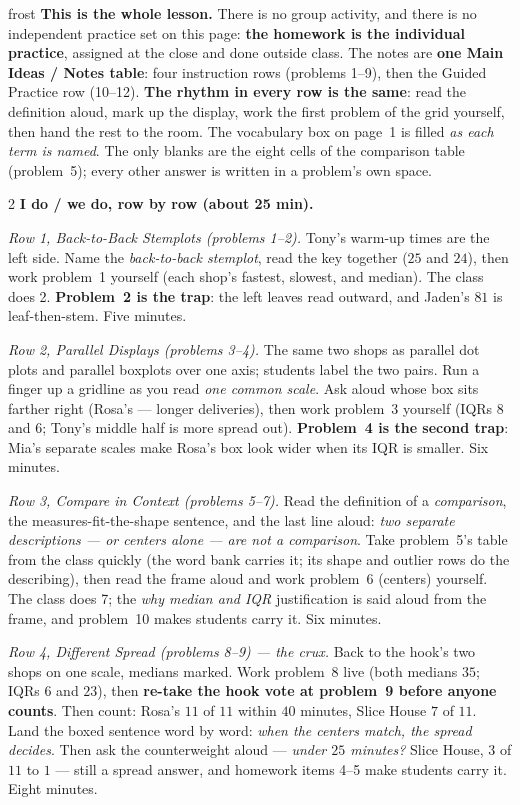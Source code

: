\documentclass[10pt]{article}
\begin{document}
\boxguard
\begin{skillbox}{frost}
\textbf{This is the whole lesson.} There is no group activity, and there is no independent
practice set on this page: \textbf{the homework is the individual practice}, assigned at the
close and done outside class. The notes are \textbf{one Main Ideas / Notes table}: four
instruction rows (problems 1--9), then the Guided Practice row (10--12). \textbf{The rhythm
in every row is the same}: read the definition aloud, mark up the display, work the first
problem of the grid yourself, then hand the rest to the room. The vocabulary box on page~1 is
filled \emph{as each term is named}. The only blanks are the eight cells of the comparison
table (problem~5); every other answer is written in a problem's own space.
\begin{multicols}{2}
\textbf{I do / we do, row by row (about 25 min).}

\emph{Row 1, Back-to-Back Stemplots (problems 1--2).} Tony's warm-up times are the left
side. Name the \emph{back-to-back stemplot}, read the key together ($25$ and $24$), then work
problem~1 yourself (each shop's fastest, slowest, and median). The class does 2.
\textbf{Problem~2 is the trap}: the left leaves read outward, and Jaden's $81$ is
leaf-then-stem. Five minutes.

\emph{Row 2, Parallel Displays (problems 3--4).} The same two shops as parallel dot plots and
parallel boxplots over one axis; students label the two pairs. Run a finger up a gridline as
you read \emph{one common scale}. Ask aloud whose box sits farther right (Rosa's --- longer
deliveries), then work problem~3 yourself (IQRs $8$ and $6$; Tony's middle half is more
spread out). \textbf{Problem~4 is the second trap}: Mia's separate scales make Rosa's box
look wider when its IQR is smaller. Six minutes.

\emph{Row 3, Compare in Context (problems 5--7).} Read the definition of a
\emph{comparison}, the measures-fit-the-shape sentence, and the last line aloud: \emph{two
separate descriptions --- or centers alone --- are not a comparison}. Take problem~5's table
from the class quickly (the word bank carries it; its shape and outlier rows do the
describing), then read the frame aloud and work problem~6 (centers) yourself. The class does
7; the \emph{why median and IQR} justification is said aloud from the frame, and problem~10
makes students carry it. Six minutes.

\emph{Row 4, Different Spread (problems 8--9) --- the crux.} Back to the hook's two shops
on one scale, medians marked. Work problem~8 live (both medians $35$; IQRs $6$ and $23$),
then \textbf{re-take the hook vote at problem~9 before anyone counts}. Then count: Rosa's
$11$ of $11$ within $40$ minutes, Slice House $7$ of $11$. Land the boxed sentence word by
word: \emph{when the centers match, the spread decides}. Then ask the counterweight aloud ---
\emph{under $25$ minutes?} Slice House, $3$ of $11$ to $1$ --- still a spread answer, and
homework items 4--5 make students carry it. Eight minutes.


\end{multicols}
\end{skillbox}
\end{document}
